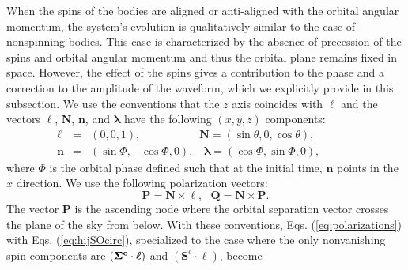 \documentclass[aps, prd,
twocolumn,%
superscriptaddress,
showpacs, nofootinbib, eqsecnum, amsmath, amssymb, floatfix
]{revtex4}
\begin{document}
When the spins of the bodies are aligned or anti-aligned with the
orbital angular momentum, the system's evolution is qualitatively
similar to the case of nonspinning bodies. This case is characterized
by the absence of precession of the spins and orbital angular momentum
and thus the orbital plane remains fixed in space. However, the effect
of the spins gives a contribution to the phase and a correction to the
amplitude of the waveform, which we explicitly provide in this
subsection.  We use the conventions that the $z$ axis coincides with
$\bm{\ell}$ and the vectors $ \bm{\ell}$, $\bm{N}$, $\bm{n}$, and $\bm{\lambda}$ have
the following $(x,y,z)$ components:
\begin{subequations}
\begin{eqnarray}
\bm{\ell}&=& (0,0,1), \; \; \; \; \;  \; \; \; \; \;  \; \; \; \; \; \; \; \; \; \bm{N}=
(\sin\theta, 0 ,\cos\theta), \; \; \; \; \; \; \; \ \; \; \; \; \; \\
 \bm{n}&=& (\sin\Phi, -\cos\Phi, 0), \ \ \ \  \bm{\lambda}=
(\cos \Phi, \sin \Phi, 0),  \ \ \ \; \; \; \; \; \; \; \; 
\end{eqnarray}
\end{subequations}
where $\Phi$ is the orbital phase defined such that at the initial time,
$\bm{n}$ points in the $x$ direction. We use the following polarization
vectors:
\begin{equation}
\bm{P}=\bm{N}\times \bm{\ell}, \ \ \ \bm{Q}=\bm{N}\times \bm{P}.
\end{equation}
The vector $\bm{P}$ is the ascending node where the orbital
separation vector crosses the plane of the sky from below. With
these conventions, Eqs. (\ref{eq:polarizations}) with Eqs.
(\ref{eq:hijSOcirc}), specialized to the case where the only
nonvanishing spin components are $(\bm{\Sigma^{\rm c}}\cdot
\bm{\ell})$ and $(\bm{S}^{\mathrm{c}}\cdot\bm{\ell})$, become
\end{document}
